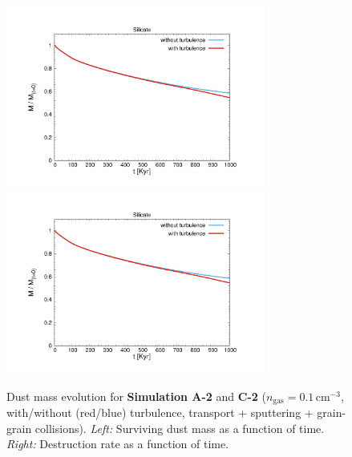 \documentclass[fleqn,usenatbib]{mnras}
\begin{document}
      \begin{figure}
 \includegraphics[trim=2.5cm 1.5cm 2.2cm 2.3cm, clip=true,page=1,height = 6cm]{Pics/Pics_A2/Evolution_total.pdf}\hspace*{-0.1cm}
 \includegraphics[trim=2.5cm 1.5cm 2.2cm 2.3cm, clip=true,page=1,height = 6cm, page =2]{Pics/Pics_A2/Evolution_total.pdf}\\
  \caption{Dust mass evolution for \textbf{Simulation A-2} and \textbf{C-2} ($n_\text{gas}=0.1\,\text{cm}^{-3}$, with/without (red/blue) turbulence, transport + sputtering + grain-grain collisions). \textit{Left:} Surviving dust mass as a function of time. \textit{Right:} Destruction rate as a function of time.}
  \label{fig_A2C2_other}  
  \end{figure}  
  
\end{document}

